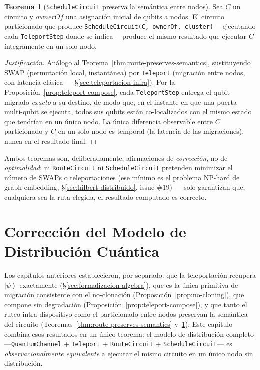 \documentclass[12pt, a4paper, openany]{report}
\theoremstyle{definition}
\newtheorem{theorem}{Teorema}[chapter]
\newcommand{\ket}[1]{\left|#1\right\rangle}
\begin{document}
\begin{theorem}[\texttt{ScheduleCircuit} preserva la semántica entre nodos]
\label{thm:schedule-preserves-semantics}
Sea $C$ un circuito y $\mathit{ownerOf}$ una asignación inicial de qubits a nodos. El circuito particionado que produce \texttt{ScheduleCircuit(C, ownerOf, cluster)} —ejecutando cada \texttt{TeleportStep} donde se indica— produce el mismo resultado que ejecutar $C$ íntegramente en un solo nodo.
\end{theorem}
\begin{proof}[Justificación]
Análogo al Teorema~\ref{thm:route-preserves-semantics}, sustituyendo \textsc{SWAP} (permutación local, instantánea) por \texttt{Teleport} (migración entre nodos, con latencia clásica — \S\ref{sec:teleportacion-infra}). Por la Proposición~\ref{prop:teleport-compose}, cada \texttt{TeleportStep} entrega el qubit migrado \emph{exacto} a su destino, de modo que, en el instante en que una puerta multi-qubit se ejecuta, todos sus qubits están co-localizados con el mismo estado que tendrían en un único nodo. La única diferencia observable entre $C$ particionado y $C$ en un solo nodo es temporal (la latencia de las migraciones), nunca en el resultado final.
\end{proof}

Ambos teoremas son, deliberadamente, afirmaciones de \emph{corrección}, no de \emph{optimalidad}: ni \texttt{RouteCircuit} ni \texttt{ScheduleCircuit} pretenden minimizar el número de \textsc{SWAP}s o teleportaciones (ese mínimo es el problema NP-hard de graph embedding, \S\ref{sec:hilbert-distribuido}, issue \#19) — solo garantizan que, cualquiera sea la ruta elegida, el resultado computado es correcto.

\chapter{Corrección del Modelo de Distribución Cuántica}
\label{ch:correccion}

Los capítulos anteriores establecieron, por separado: que la teleportación recupera $\ket{\psi}$ exactamente (\S\ref{sec:formalizacion-algebra}), que es la única primitiva de migración consistente con el no-clonación (Proposición~\ref{prop:no-cloning}), que compone sin degradación (Proposición~\ref{prop:teleport-compose}), y que tanto el ruteo intra-dispositivo como el particionado entre nodos preservan la semántica del circuito (Teoremas~\ref{thm:route-preserves-semantics} y~\ref{thm:schedule-preserves-semantics}). Este capítulo combina esos resultados en un único teorema: el modelo de distribución completo —\texttt{QuantumChannel} + \texttt{Teleport} + \texttt{RouteCircuit} + \texttt{ScheduleCircuit}— es \emph{observacionalmente equivalente} a ejecutar el mismo circuito en un único nodo sin distribución.
\end{document}
